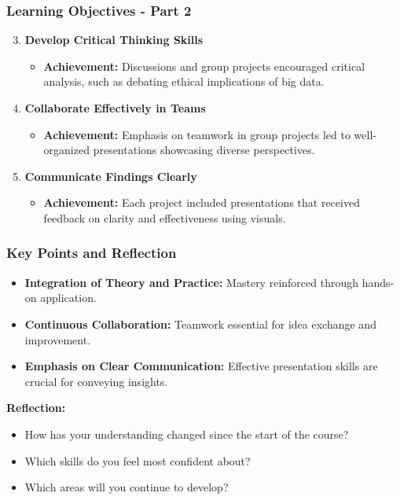 \documentclass[aspectratio=169]{beamer}
\begin{document}
\begin{frame}[fragile]
    \frametitle{Learning Objectives - Part 2}
    \begin{enumerate}
        \setcounter{enumi}{2}
        \item \textbf{Develop Critical Thinking Skills}
        \begin{itemize}
            \item \textbf{Achievement:} Discussions and group projects encouraged critical analysis, such as debating ethical implications of big data.
        \end{itemize}

        \item \textbf{Collaborate Effectively in Teams}
        \begin{itemize}
            \item \textbf{Achievement:} Emphasis on teamwork in group projects led to well-organized presentations showcasing diverse perspectives.
        \end{itemize}

        \item \textbf{Communicate Findings Clearly}
        \begin{itemize}
            \item \textbf{Achievement:} Each project included presentations that received feedback on clarity and effectiveness using visuals.
        \end{itemize}
    \end{enumerate}
\end{frame}

\begin{frame}[fragile]
    \frametitle{Key Points and Reflection}
    \begin{itemize}
        \item \textbf{Integration of Theory and Practice:} Mastery reinforced through hands-on application.
        \item \textbf{Continuous Collaboration:} Teamwork essential for idea exchange and improvement.
        \item \textbf{Emphasis on Clear Communication:} Effective presentation skills are crucial for conveying insights.
    \end{itemize}
    
    \textbf{Reflection:}
    \begin{itemize}
        \item How has your understanding changed since the start of the course?
        \item Which skills do you feel most confident about?
        \item Which areas will you continue to develop?
    \end{itemize}
\end{frame}
\end{document}
